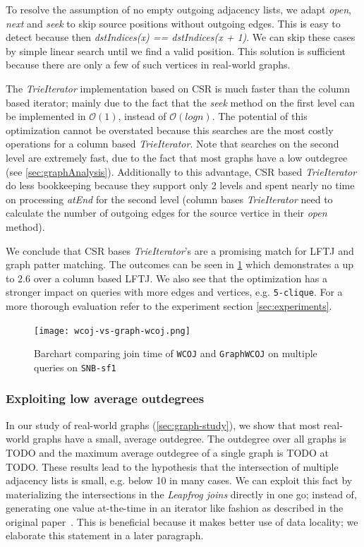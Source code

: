 To resolve the assumption of no empty outgoing adjacency lists, we adapt \textit{open}, \textit{next} and \textit{seek} to skip source
positions without outgoing edges.
This is easy to detect because then \textit{dstIndices(x) == dstIndices(x + 1)}.
We can skip these cases by simple linear search until we find a valid position.
This solution is sufficient because there are only a few of such vertices in real-world graphs. %

The \textit{TrieIterator} implementation based on \textsc{CSR} is much faster than the column based iterator; mainly due to the fact
that the \textit{seek} method on the first level can be implemented in $\mathcal{O}(1)$, instead of $\mathcal{O}(log n)$.
The potential of this optimization cannot be overstated because this searches are the most costly operations for a column based
\textit{TrieIterator}.
Note that searches on the second level are extremely fast, due to the fact that most graphs have a low outdegree (see
\cref{sec:graphAnalysis}).
Additionally to this advantage, \textsc{CSR} based \textit{TrieIterator} do less bookkeeping because they support only 2 levels and spent
nearly no time on processing \textit{atEnd} for the second level (column bases \textit{TrieIterator} need to calculate the number of
outgoing edges for the source vertice in their \textit{open} method).

We conclude that \textsc{CSR} bases \textit{TrieIterator}'s are a promising match for \textsc{LFTJ} and graph patter matching.
The outcomes can be seen in \cref{fig:wcoj-vs-graphWCOJ} which demonstrates a up to 2.6 over a column based \textsc{LFTJ}.  %
We also see that the optimization has a stronger impact on queries with more edges and vertices, e.g. \texttt{5-clique}.
For a more thorough evaluation refer to the experiment section \ref{sec:experiments}.

\begin{figure}
    \texttt{[image: wcoj-vs-graph-wcoj.png]}
    \caption{Barchart comparing join time of \texttt{WCOJ} and \texttt{GraphWCOJ} on multiple queries on \texttt{SNB-sf1}}
    \label{fig:wcoj-vs-graphWCOJ}
\end{figure}


\subsubsection{Exploiting low average outdegrees}

In our study of real-world graphs (\cref{sec:graph-study}), we show that most real-world graphs have a small, average outdegree.
The outdegree over all graphs is TODO and the maximum average outdegree of a single graph
is TODO at TODO.
These results lead to the hypothesis that the intersection of multiple adjacency lists is small, e.g. below 10 in many cases.
We can exploit this fact by materializing the intersections in the \textit{Leapfrog joins} directly
in one go; instead of, generating one value at-the-time in an iterator like fashion as described in the
original paper~\cite{lftj}.
This is beneficial because it makes better use of data locality; we elaborate this statement in a later
paragraph.

